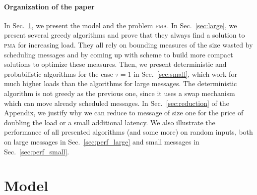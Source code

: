 \documentclass[a4paper,UKenglish,cleveref, autoref, thm-restate]{lipics-v2019}
\newcommand\pma{\textsc{pma}\xspace}
\begin{document}
\paragraph*{Organization of the paper}

In Sec.~\ref{sec:model}, we present the model and the problem \pma. In Sec.~\ref{sec:large},
we present several greedy algorithms and prove that they always find a solution to \pma for increasing load. 
They all rely on bounding measures of the size wasted by scheduling messages and by coming up with scheme to
build more compact solutions to optimize these measures. 
   Then, we present deterministic and probabilistic algorithms for the case $\tau = 1$ in Sec.~\ref{sec:small}, which work for much higher loads than the algorithms for large messages. The deterministic algorithm is not greedy as the previous one, since it uses a swap mechanism which can move already scheduled messages. 
 In Sec.~\ref{sec:reduction} of the Appendix, we justify why we can reduce to message of size one for the price of doubling the load or a small additional latency. We also illustrate the performance of all presented algorithms (and some more) on random inputs, both on large messages in Sec.~\ref{sec:perf_large} and small messages in Sec.~\ref{sec:perf_small}.


\section{Model}\label{sec:model}
\end{document}
